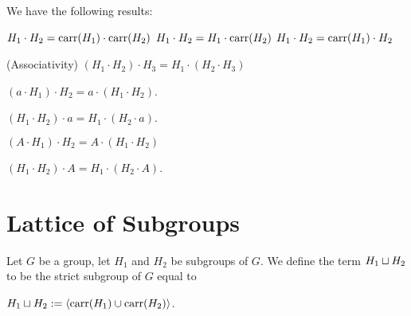 \documentclass{article}
\begin{document}
We have the following results:
\begin{thm}
\item\label{group4:43} $H_{1}\cdot H_{2}=\operatorname{carr}(H_{1})\cdot\operatorname{carr}(H_{2})$
  $H_{1}\cdot H_{2}=H_{1}\cdot\operatorname{carr}(H_{2})$
  $H_{1}\cdot H_{2}=\operatorname{carr}(H_{1})\cdot H_{2}$
\item\label{group4:44} (Associativity) $(H_{1}\cdot H_{2})\cdot H_{3}=H_{1}\cdot(H_{2}\cdot H_{3})$
\item\label{group4:45} $(a\cdot H_{1})\cdot H_{2}=a\cdot(H_{1}\cdot H_{2})$.
\item\label{group4:46} $(H_{1}\cdot H_{2})\cdot a=H_{1}\cdot(H_{2}\cdot a)$.
\item\label{group4:47} $(A\cdot H_{1})\cdot H_{2}=A\cdot(H_{1}\cdot H_{2})$
\item\label{group4:48} $(H_{1}\cdot H_{2})\cdot A=H_{1}\cdot(H_{2}\cdot A)$.
\end{thm}

\section{Lattice of Subgroups}

\begin{definition}
Let $G$ be a group, let $H_{1}$ and $H_{2}$ be subgroups of $G$.
We define the term $H_{1}\sqcup H_{2}$ to be the strict subgroup of $G$
equal to
\begin{defn}
\item $H_{1}\sqcup H_{2}:=\langle\operatorname{carr}(H_{1})\cup\operatorname{carr}(H_{2})\rangle$.
\end{defn}
\end{definition}
\end{document}
